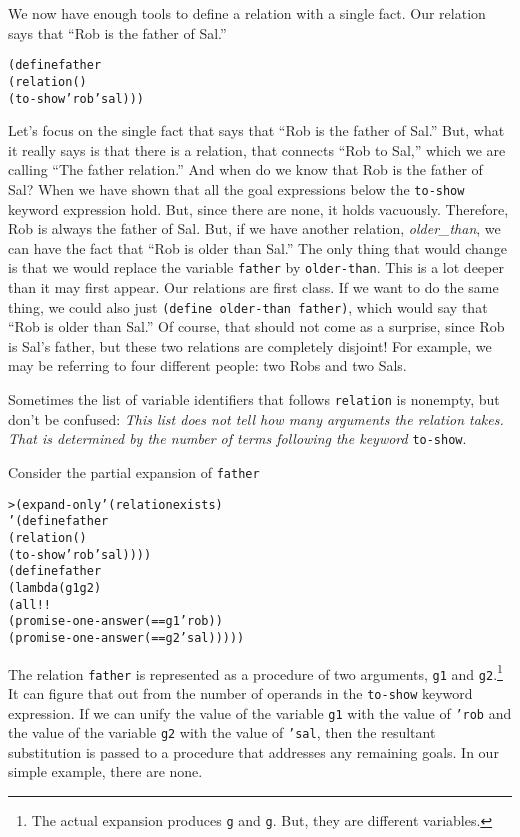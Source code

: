 We now have enough tools to define a relation with a single fact.
Our relation says that ``Rob is the father of Sal.''

\begin{alltt}
(define father
  (relation ()
    (to-show 'rob 'sal)))
\end{alltt}

Let's focus on the single fact that says that ``Rob is the father of
Sal.''  But, what it really says is that there is a relation, that
connects ``Rob to Sal,'' which we are calling ``The father relation.''
And when do we know that Rob is the father of Sal?  When we have shown
that all the goal expressions below the \texttt{to-show} keyword
expression hold.  But, since there are none, it holds vacuously.
Therefore, Rob is always the father of Sal.  But, if we have another
relation, \emph{older\_than}, we can have the fact that ``Rob is older
than Sal.''  The only thing that would change is that we would replace
the variable \texttt{father} by \texttt{older-than}.  This is a lot
deeper than it may first appear.  Our relations are first class.  If
we want to do the same thing, we could also just \texttt{(define
older-than father)}, which would say that ``Rob is older than Sal.''
Of course, that should not come as a surprise, since Rob is Sal's
father, but these two relations are completely disjoint!  For example,
we may be referring to four different people: two Robs and two Sals.

Sometimes the list of variable identifiers that follows
\texttt{relation} is nonempty, but don't be confused: \emph{This list
does not tell how many arguments the relation takes. That is
determined by the number of terms following the keyword}
\texttt{to-show}.

Consider the partial expansion of \texttt{father}
\begin{alltt}
> (expand-only '(relation exists)
    '(define father
       (relation ()
         (to-show 'rob 'sal))))
(define father
  (lambda (g1 g2)
    (all!!
      (promise-one-answer (== g1 'rob))
      (promise-one-answer (== g2 'sal)))))
\end{alltt}

The relation \texttt{father} is represented as a procedure of two
arguments, \texttt{g1} and \texttt{g2}.\footnote{The actual expansion
produces \texttt{g} and \texttt{g}.  But, they are different
variables.} It can figure that out from the number of operands in the
\texttt{to-show} keyword expression.  If we can unify the value of the
variable \texttt{g1} with the value of \texttt{'rob} and the value of
the variable \texttt{g2} with the value of \texttt{'sal}, then the
resultant substitution is passed to a procedure that addresses any
remaining goals.  In our simple example, there are none.

